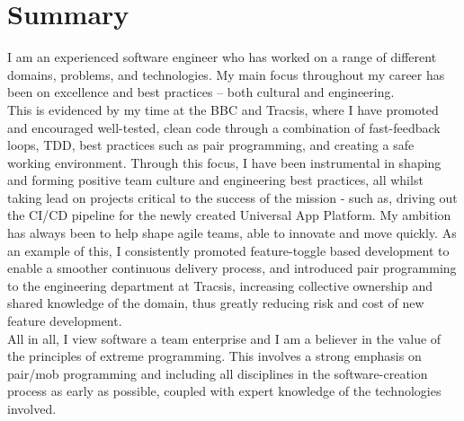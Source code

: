 \section{Summary}

I am an experienced software engineer who has worked on a range of different domains, problems, and technologies. My main focus throughout my career has been on excellence and best practices – both cultural and engineering.\\

This is evidenced by my time at the BBC and Tracsis, where I have promoted and encouraged well-tested, clean code through a combination of fast-feedback loops, TDD, best practices such as pair programming, and creating a safe working environment. Through this focus, I have been instrumental in shaping and forming positive team culture and engineering best practices, all whilst taking lead on projects critical to the success of the mission - such as, driving out the CI/CD pipeline for the newly created Universal App Platform. My ambition has always been to help shape agile teams, able to innovate and move quickly. As an example of this, I consistently promoted feature-toggle based development to enable a smoother continuous delivery process, and introduced pair programming to the engineering department at Tracsis, increasing collective ownership and shared knowledge of the domain, thus greatly reducing risk and cost of new feature development.\\

All in all, I view software a team enterprise and I am a believer in the value of the principles of extreme programming. This involves a strong emphasis on pair/mob programming and including all disciplines in the software-creation process as early as possible, coupled with expert knowledge of the technologies involved.\\
